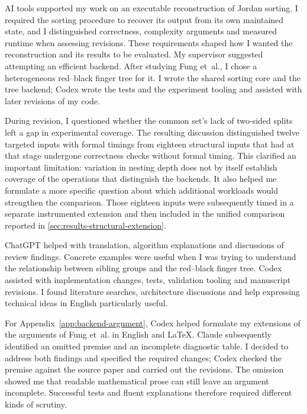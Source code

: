 AI tools supported my work on an executable reconstruction of Jordan sorting.
I required the sorting procedure to recover its output from its own maintained
state, and I distinguished correctness, complexity arguments and measured runtime
when assessing revisions. These requirements shaped how I wanted the
reconstruction and its results to be evaluated. My supervisor suggested
attempting an efficient backend. After studying Fung et~al., I chose a
heterogeneous red--black finger tree for it. I wrote the shared sorting core
and the tree backend; Codex wrote the tests and the experiment tooling and
assisted with later revisions of my code.

During revision, I questioned whether the common set's lack of two-sided splits
left a gap in experimental coverage. The resulting discussion distinguished
twelve targeted inputs with formal timings from eighteen structural inputs that
had at that stage undergone correctness checks without formal timing. This clarified an
important limitation: variation in nesting depth does not by itself establish
coverage of the operations that distinguish the backends. It also helped me
formulate a more specific question about which additional workloads would
strengthen the comparison.
Those eighteen inputs were subsequently timed in a separate instrumented
extension and then included in the unified comparison reported in
\cref{sec:results-structural-extension}.

ChatGPT helped with translation, algorithm explanations and discussions of review
findings. Concrete examples were useful when I was trying to understand the
relationship between sibling groups and the red--black finger tree. Codex
assisted with implementation changes, tests, validation tooling and manuscript
revisions. I found literature searches, architecture discussions and help
expressing technical ideas in English particularly useful.

For Appendix~\ref{app:backend-argument}, Codex helped formulate my extensions of
the arguments of Fung et~al. in English and LaTeX. Claude subsequently identified
an omitted premise and an incomplete diagnostic table. I decided to address both
findings and specified the required changes; Codex checked the premise against
the source paper and carried out the revisions. The omission showed me that
readable mathematical prose can still leave an argument incomplete. Successful
tests and fluent explanations therefore required different kinds of scrutiny.

